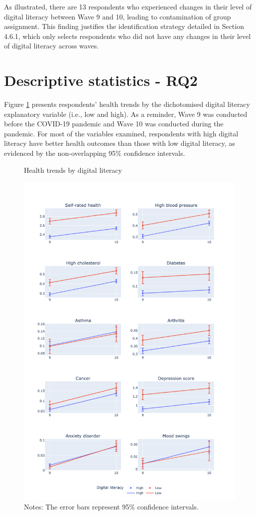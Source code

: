 As illustrated, there are 13 respondents who experienced changes in their level of digital literacy between Wave 9 and 10, leading to contamination of group assignment. This finding justifies the identification strategy detailed in Section 4.6.1, which only selects respondents who did not have any changes in their level of digital literacy across waves.

\section{Descriptive statistics - RQ2}
Figure \ref{fig:desc_stats_rq2} presents respondents’ health trends by the dichotomised digital literacy explanatory variable (i.e., low and high). As a reminder, Wave 9 was conducted before the COVID-19 pandemic and Wave 10 was conducted during the pandemic. For most of the variables examined, respondents with high digital literacy have better health outcomes than those with low digital literacy, as evidenced by the non-overlapping 95\% confidence intervals.

\begin{figure}
    \centering
    \caption{Health trends by digital literacy}
    \label{fig:desc_stats_rq2}
    \includegraphics[width=\textwidth]{figures/desc_stats_q2.png}
    \caption*{Notes: The error bars represent 95\% confidence intervals.}
\end{figure}

